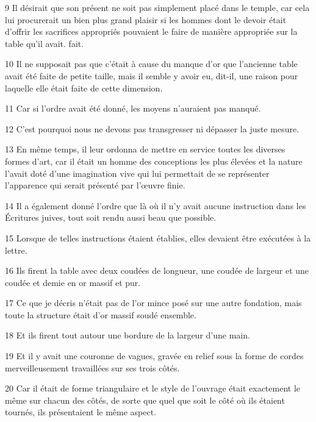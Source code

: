 \par 9 Il désirait que son présent ne soit pas simplement placé dans le temple, car cela lui procurerait un bien plus grand plaisir si les hommes dont le devoir était d'offrir les sacrifices appropriés pouvaient le faire de manière appropriée sur la table qu'il avait. fait.

\par 10 Il ne supposait pas que c'était à cause du manque d'or que l'ancienne table avait été faite de petite taille, mais il semble y avoir eu, dit-il, une raison pour laquelle elle était faite de cette dimension.

\par 11 Car si l'ordre avait été donné, les moyens n'auraient pas manqué.

\par 12 C'est pourquoi nous ne devons pas transgresser ni dépasser la juste mesure.

\par 13 En même temps, il leur ordonna de mettre en service toutes les diverses formes d'art, car il était un homme des conceptions les plus élevées et la nature l'avait doté d'une imagination vive qui lui permettait de se représenter l'apparence qui serait présenté par l’œuvre finie.

\par 14 Il a également donné l'ordre que là où il n'y avait aucune instruction dans les Écritures juives, tout soit rendu aussi beau que possible.

\par 15 Lorsque de telles instructions étaient établies, elles devaient être exécutées à la lettre.

\par 16 Ils firent la table avec deux coudées de longueur, une coudée de largeur et une coudée et demie en or massif et pur.

\par 17 Ce que je décris n'était pas de l'or mince posé sur une autre fondation, mais toute la structure était d'or massif soudé ensemble.

\par 18 Et ils firent tout autour une bordure de la largeur d'une main.

\par 19 Et il y avait une couronne de vagues, gravée en relief sous la forme de cordes merveilleusement travaillées sur ses trois côtés.

\par 20 Car il était de forme triangulaire et le style de l'ouvrage était exactement le même sur chacun des côtés, de sorte que quel que soit le côté où ils étaient tournés, ils présentaient le même aspect.

